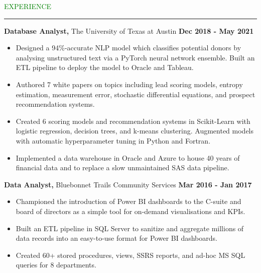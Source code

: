 \documentclass [
        11pt
] {article}
\begin{document}

\noindent\textcolor{green}{EXPERIENCE \rule{15.8cm}{1pt}}

\vspace*{10pt}

\noindent \textbf {Database Analyst,} The University of Texas at Austin
\hspace*{\fill} \textbf {Dec 2018 - May 2021}


\begin{itemize}[itemsep=1pt,topsep=1pt]
\renewcommand{\labelitemi}{\scriptsize$\blacksquare$}

\item Designed a 94\%-accurate NLP model which classifies potential donors
by analysing unstructured text via a PyTorch neural network ensemble.
Built an ETL pipeline to deploy the model to Oracle and Tableau.

\item Authored 7 white papers on topics including lead scoring models, entropy
estimation, measurement error, stochastic differential equations, and prospect
recommendation systems.

\item Created 6 scoring models and recommendation systems in Scikit-Learn with
logistic regression, decision trees, and k-means clustering. Augmented models
with automatic hyperparameter tuning in Python and Fortran.

\item Implemented a data warehouse in Oracle and Azure to house 40 years of
financial data and to replace a slow unmaintained SAS data pipeline.

\end{itemize}

\vspace*{5pt}

\noindent \textbf {Data Analyst,} Bluebonnet Trails Community Services
\hspace*{\fill} \textbf {Mar 2016 - Jan 2017}


\begin{itemize}[itemsep=1pt,topsep=1pt]
\renewcommand{\labelitemi}{\scriptsize$\blacksquare$}


\item Championed the introduction of Power BI dashboards to the C-suite
and board of directors as a simple tool for on-demand visualisations and KPIs.

\item Built an ETL pipeline in SQL Server to sanitize and aggregate
millions of data records into an easy-to-use format for Power BI dashboards.

\item Created 60+ stored procedures, views, SSRS reports, and ad-hoc
MS SQL queries for 8 departments.

\end{itemize}
\end{document}
